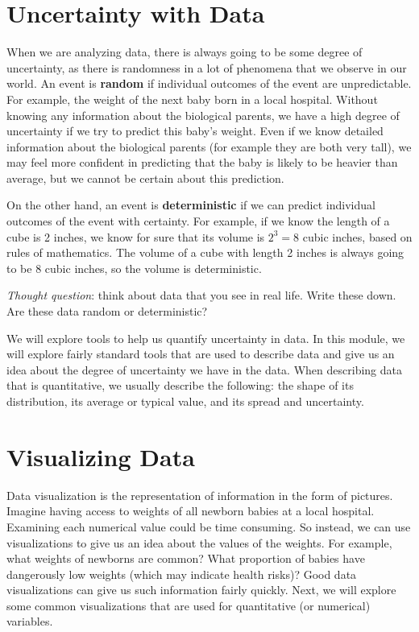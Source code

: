 \documentclass[
]{book}
\begin{document}
\hypertarget{uncertainty-with-data}{%
\section{Uncertainty with Data}\label{uncertainty-with-data}}

When we are analyzing data, there is always going to be some degree of uncertainty, as there is randomness in a lot of phenomena that we observe in our world. An event is \textbf{random} if individual outcomes of the event are unpredictable. For example, the weight of the next baby born in a local hospital. Without knowing any information about the biological parents, we have a high degree of uncertainty if we try to predict this baby's weight. Even if we know detailed information about the biological parents (for example they are both very tall), we may feel more confident in predicting that the baby is likely to be heavier than average, but we cannot be certain about this prediction.

On the other hand, an event is \textbf{deterministic} if we can predict individual outcomes of the event with certainty. For example, if we know the length of a cube is 2 inches, we know for sure that its volume is \(2^3 = 8\) cubic inches, based on rules of mathematics. The volume of a cube with length 2 inches is always going to be 8 cubic inches, so the volume is deterministic.

\emph{Thought question}: think about data that you see in real life. Write these down. Are these data random or deterministic?

We will explore tools to help us quantify uncertainty in data. In this module, we will explore fairly standard tools that are used to describe data and give us an idea about the degree of uncertainty we have in the data. When describing data that is quantitative, we usually describe the following: the shape of its distribution, its average or typical value, and its spread and uncertainty.

\hypertarget{visualizing-data}{%
\section{Visualizing Data}\label{visualizing-data}}

Data visualization is the representation of information in the form of pictures. Imagine having access to weights of all newborn babies at a local hospital. Examining each numerical value could be time consuming. So instead, we can use visualizations to give us an idea about the values of the weights. For example, what weights of newborns are common? What proportion of babies have dangerously low weights (which may indicate health risks)? Good data visualizations can give us such information fairly quickly. Next, we will explore some common visualizations that are used for quantitative (or numerical) variables.
\end{document}
